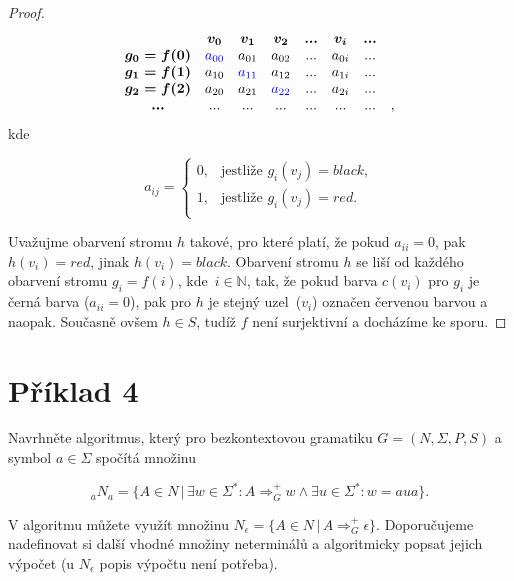 \documentclass[a4paper, 12pt]{article}
\theoremstyle{definition}
\theoremstyle{definition}
\theoremstyle{definition}
\theoremstyle{remark}
\begin{document}
\begin{enumerate}[label=(\alph*)]
\begin{proof}
        $$
            \begin{matrix}
                                & \boldsymbol{v_0} & \boldsymbol{v_1} & \boldsymbol{v_2} & \boldsymbol{...} & \boldsymbol{v_i} & \boldsymbol{...}&\\
            \boldsymbol{g_0 = f(0)} & \textcolor{blue}{a_{00}} & a_{01} & a_{02} & ... & a_{0i} & ...&\\
            \boldsymbol{g_1 = f(1)} & a_{10} & \textcolor{blue}{a_{11}} & a_{12} & ... & a_{1i} & ...&\\
            \boldsymbol{g_2 = f(2)} & a_{20} & a_{21} & \textcolor{blue}{a_{22}} & ... & a_{2i} & ...&\\
            \boldsymbol{...}        & ...    & ...    & ...    & ... & ...    & ...&,\\
            \end{matrix}
        $$
        \noindent
        kde

        $$
        a_{ij} =
        \begin{cases}
        0, & \text{jestliže } g_i(v_j) = black,\\
        1, & \text{jestliže } g_i(v_j) = red.\\
        \end{cases}
        $$

        Uvažujme obarvení stromu $h$ takové, pro které platí, že pokud $a_{ii} = 0$, pak $h(v_i) = red$, jinak $h(v_i) = black$. Obarvení stromu $h$ se liší od každého obarvení stromu $g_i = f(i)$, kde~$i \in \mathbb{N}$, tak, že pokud barva $c(v_i)$ pro $g_i$ je černá barva ($a_{ii} = 0$), pak pro $h$ je stejný uzel~($v_i$) označen červenou barvou a naopak. Současně ovšem $h \in S$, tudíž $f$ není surjektivní a docházíme ke sporu.
    \end{proof}
\end{enumerate}

\section{Příklad 4}
Navrhněte algoritmus, který pro bezkontextovou gramatiku $G = (N, \Sigma, P, S)$ a symbol $a \in \Sigma$ spočítá množinu

$${}_{a}N_{a} = \{A \in N \, | \, \exists w \in \Sigma^\ast: A \Rightarrow^+_G w \wedge \exists u \in \Sigma^\ast: w = aua\}.$$

V algoritmu můžete využít množinu $N_\epsilon = \{A \in N \, | \, A \Rightarrow^+_G \epsilon\}$. Doporučujeme nadefinovat si další vhodné množiny neterminálů a algoritmicky popsat jejich výpočet (u $N_\epsilon$ popis výpočtu není potřeba).
\end{document}
